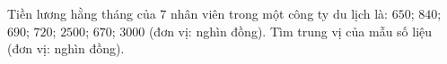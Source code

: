 \begin{ex}
Tiền lương hằng tháng của $7$ nhân viên trong một công ty du lịch là: $650$; $840$; $690$; $720$; $2500$; $670$; $3000$ (đơn vị: nghìn đồng). Tìm trung vị của mẫu số liệu (đơn vị: nghìn đồng).
\end{ex}

